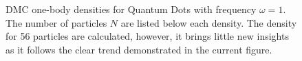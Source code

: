 \begin{figure}
\begin{center}
  \caption{DMC one-body densities for Quantum Dots with frequency $\omega=1$. The number of particles $N$ are listed below each density. The density for 56 particles are calculated, however, it brings little new insights as it follows the clear trend demonstrated in the current figure.}
  \label{fig:OBD_DMC_QDOTS_w1}
 \end{center}
\end{figure}



\begin{figure}
 \begin{center}
     \\

\end{center}
\end{figure}
